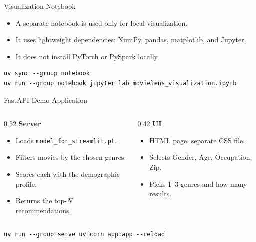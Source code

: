 \documentclass[aspectratio=169]{beamer}
\begin{document}
\begin{frame}[fragile]{Visualization Notebook}
\begin{itemize}
  \item A separate notebook is used only for local visualization.
  \item It uses lightweight dependencies: NumPy, pandas, matplotlib, and Jupyter.
  \item It does not install PyTorch or PySpark locally.
\end{itemize}

\vspace{0.25cm}

\begin{lstlisting}[style=code]
uv sync --group notebook
uv run --group notebook jupyter lab movielens_visualization.ipynb
\end{lstlisting}
\end{frame}

\begin{frame}[fragile]{FastAPI Demo Application}
\begin{columns}
  \begin{column}{0.52\textwidth}
    \textbf{Server}
    \begin{itemize}
      \item Loads \texttt{model\_for\_streamlit.pt}.
      \item Filters movies by the chosen genres.
      \item Scores each with the demographic profile.
      \item Returns the top-$N$ recommendations.
    \end{itemize}
  \end{column}
  \begin{column}{0.42\textwidth}
    \textbf{UI}
    \begin{itemize}
      \item HTML page, separate CSS file.
      \item Selects Gender, Age, Occupation, Zip.
      \item Picks 1--3 genres and how many results.
    \end{itemize}
  \end{column}
\end{columns}

\vspace{0.25cm}

\begin{lstlisting}[style=code]
uv run --group serve uvicorn app:app --reload
\end{lstlisting}
\end{frame}
\end{document}
